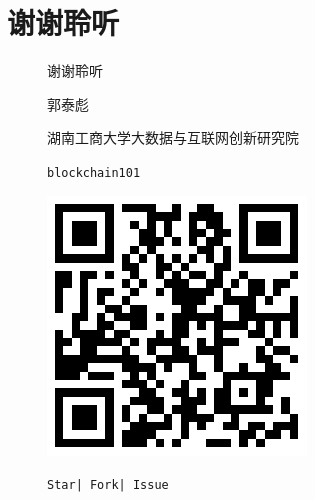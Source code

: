 \documentclass[11pt]{beamer}
\begin{document}
\section*{谢谢聆听}

\begin{frame}
	\begin{minipage}[t]{0.5\linewidth}
		\begin{center}
			\begin{figure}
				\vspace{10pt}
				
				{\Huge 谢谢聆听}
				
				\vspace{30pt}
				郭泰彪
				
				\vspace{10pt}
				{\tiny 湖南工商大学大数据与互联网创新研究院}
			\end{figure}
			\begin{figure}
				
			\end{figure}
		\end{center}
	\end{minipage}%
	\begin{minipage}[t]{0.4\linewidth}
		\begin{figure}
			\centering
			\texttt{blockchain101}
			
			\includegraphics[width=0.6\linewidth]{figures/blockchain101qrcode}
			
			{\footnotesize \texttt{Star| Fork| Issue}}
		\end{figure}
	\end{minipage}%
\end{frame}
\end{document}
